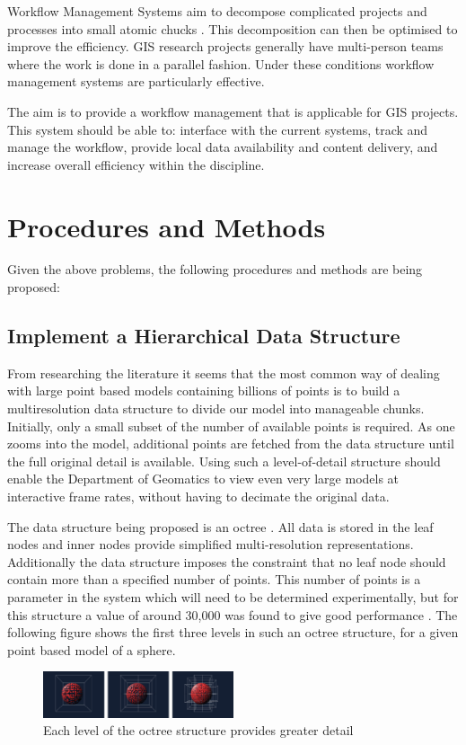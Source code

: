 \documentclass[12pt,a4paper]{article}
\begin{document}
Workflow Management Systems aim to decompose complicated projects and processes into
small atomic chucks \cite{Taylor:2006:WES:1196459}. This decomposition can then be
optimised to improve the efficiency.
GIS research projects generally have multi-person teams where the work is
done in a parallel fashion. Under these conditions workflow management systems
are particularly effective.

The aim is to provide a workflow management that is applicable for GIS projects.
This system should be able to: interface with the current systems, track and
manage the workflow, provide local data availability and content delivery, and
increase overall efficiency within the discipline.

\section{Procedures and Methods}
Given the above problems, the following procedures and methods are being proposed:
\subsection{Implement a Hierarchical Data Structure}
From researching the literature it seems that the most common way of dealing
with large point based models containing billions of points is to build a
multiresolution data structure to divide our model into manageable chunks.
Initially, only a small subset of the number of available points is required.
As one zooms into the model, additional points are fetched from the
data structure until the full original detail is available. Using such a
level-of-detail structure should enable the Department of Geomatics to
view even very large models at interactive frame rates, without having
to decimate the original data.

The data structure being proposed is an octree \cite{interactivepointclouds}. All
data is stored in the leaf nodes and inner nodes provide simplified multi-resolution
representations. Additionally the data structure imposes the constraint that no leaf
node should contain more than a specified number of points. This number of points is
a parameter in the system which will need to be determined experimentally, but for
this structure a value of around 30,000 was found to give good performance
\cite{interactivepointclouds}. The following figure shows the first three levels in such an octree structure, for a given point based model of a sphere.
\begin{figure}[h!]
\centering
    \includegraphics[width=0.5\textwidth]{oct.png}
    \caption{Each level of the octree structure provides greater detail}
\end{figure}
\end{document}
